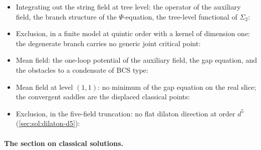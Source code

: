 \begin{itemize}
  \item Integrating out the string field at tree level: the operator of the auxiliary field, the branch structure of the $\Psi$-equation, the tree-level functional of $\Sigma_2$:

  \item Exclusion, in a finite model at quintic order with a kernel of dimension one: the degenerate branch carries no generic joint critical point:

  \item Mean field: the one-loop potential of the auxiliary field, the gap equation, and the obstacles to a condensate of BCS type:

  \item Mean field at level $(1, 1)$: no minimum of the gap equation on the real slice; the convergent saddles are the displaced classical points:

  \item Exclusion, in the five-field truncation: no flat dilaton direction at order $d^5$ (\cref{sec:sol:dilaton-d5}):
\end{itemize}

\paragraph{The section on classical solutions.}

